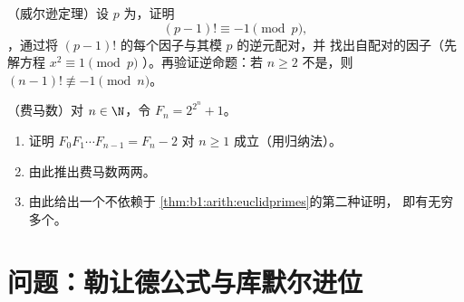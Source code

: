 \begin{exercise}[$\star\star\star$]\label{exo:b1:arith:11}
（威尔逊定理）设 $p$ 为，证明
\[
(p-1)! \equiv -1 \pmod p ,
\]
，通过将 $(p-1)!$ 的每个因子与其模 $p$ 的逆元配对，并
找出自配对的因子（先解方程 $x^2 \equiv 1 \pmod p$
）。再验证逆命题：若 $n \geq 2$ 不是，则 $(n-1)!
\not\equiv -1 \pmod n$。
\end{exercise}

\begin{exercise}[$\star\star\star$]\label{exo:b1:arith:12}
（费马数）对 $n \in \N$，令 $F_n = 2^{2^n} + 1$。
\begin{enumerate}
  \item 证明 $F_0 F_1 \cdots F_{n-1} = F_n - 2$ 对 $n \geq
        1$ 成立（用归纳法）。
  \item 由此推出费马数两两。
  \item 由此给出一个不依赖于
        \cref{thm:b1:arith:euclidprimes}的第二种证明，
        即有无穷多个。
\end{enumerate}
\end{exercise}

\section{问题：勒让德公式与库默尔进位}

